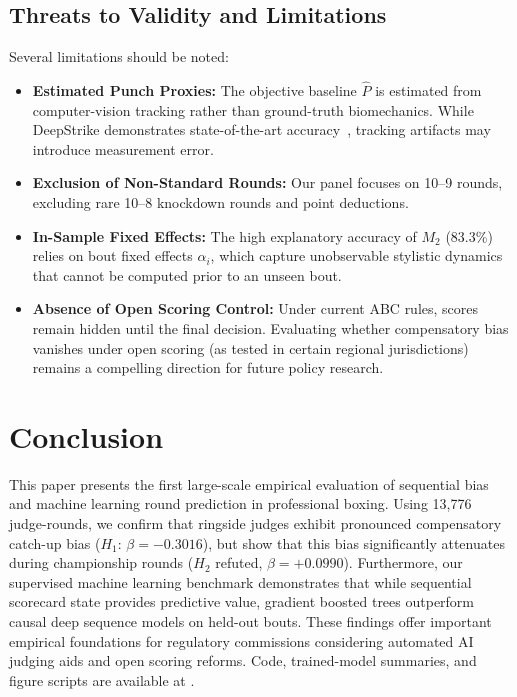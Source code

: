 \documentclass[conference]{IEEEtran}
\begin{document}
\subsection{Threats to Validity and Limitations}
Several limitations should be noted:
\begin{itemize}
    \item \textbf{Estimated Punch Proxies:} The objective baseline $\hat{P}$ is estimated from computer-vision tracking rather than ground-truth biomechanics. While DeepStrike demonstrates state-of-the-art accuracy~\cite{jabbr2023}, tracking artifacts may introduce measurement error.
    \item \textbf{Exclusion of Non-Standard Rounds:} Our panel focuses on 10--9 rounds, excluding rare 10--8 knockdown rounds and point deductions.
    \item \textbf{In-Sample Fixed Effects:} The high explanatory accuracy of $M_2$ (83.3\%) relies on bout fixed effects $\alpha_i$, which capture unobservable stylistic dynamics that cannot be computed prior to an unseen bout.
    \item \textbf{Absence of Open Scoring Control:} Under current ABC rules, scores remain hidden until the final decision. Evaluating whether compensatory bias vanishes under open scoring (as tested in certain regional jurisdictions) remains a compelling direction for future policy research.
\end{itemize}

\section{Conclusion}
This paper presents the first large-scale empirical evaluation of sequential bias and machine learning round prediction in professional boxing. Using 13,776 judge-rounds, we confirm that ringside judges exhibit pronounced compensatory catch-up bias ($H_1$: $\beta = -0.3016$), but show that this bias significantly attenuates during championship rounds ($H_2$ refuted, $\beta = +0.0990$). Furthermore, our supervised machine learning benchmark demonstrates that while sequential scorecard state provides predictive value, gradient boosted trees outperform causal deep sequence models on held-out bouts. These findings offer important empirical foundations for regulatory commissions considering automated AI judging aids and open scoring reforms. Code, trained-model summaries, and figure scripts are available at \repolink.



\end{document}

